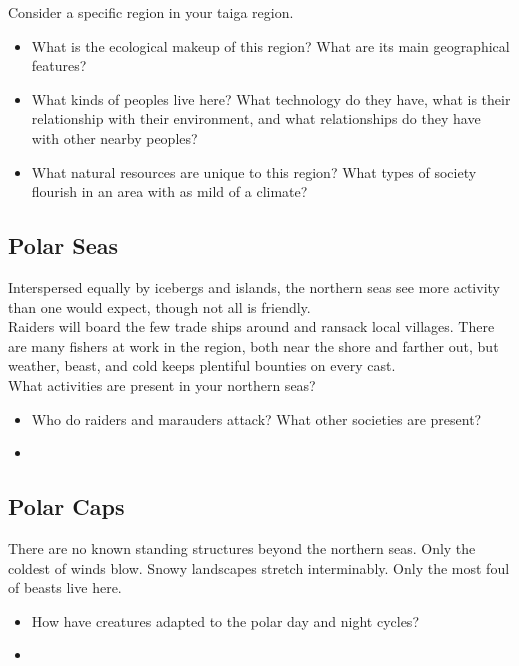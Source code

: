 \documentclass[a4paper]{article}
\begin{document}
\begin{multicols}{2}
Consider a specific region in your taiga region.

\begin{itemize}
\item What is the ecological makeup of this region? What are its main geographical features?
\item What kinds of peoples live here? What technology do they have, what is their relationship with their environment, and what relationships do they have with other nearby peoples?
\item What natural resources are unique to this region? What types of society flourish in an area with as mild of a climate?
\end{itemize}

\subsection{Polar Seas} Interspersed equally by icebergs and islands, the northern seas see more activity than one would expect, though not all is friendly. \\

Raiders will board the few trade ships around and ransack local villages. There are many fishers at work in the region, both near the shore and farther out, but weather, beast, and cold keeps plentiful bounties on every cast. \\

What activities are present in your northern seas?

\begin{itemize}
\item Who do raiders and marauders attack? What other societies are present?
\item 
\end{itemize}

\subsection{Polar Caps}

There are no known standing structures beyond the northern seas. Only the coldest of winds blow. Snowy landscapes stretch interminably. Only the most foul of beasts live here.

\begin{itemize}
\item How have creatures adapted to the polar day and night cycles?
\item 
\end{itemize}


\end{multicols}
\end{document}
